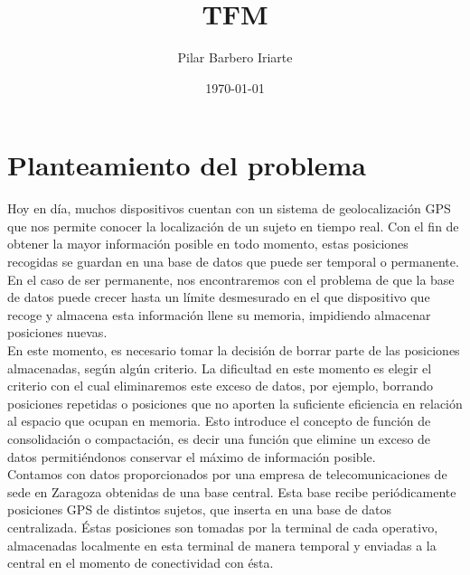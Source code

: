 \documentclass[a4paper, 12pt]{article}
\title{TFM}
\author{Pilar Barbero Iriarte}
\date{\today}
\begin{document}
\maketitle

\newpage

\tableofcontents

\newpage

\mbox{}
\thispagestyle{empty}
\newpage

\pagebreak

\newpage

\section{Planteamiento del problema}

Hoy en d\'ia, muchos dispositivos cuentan con un sistema de geolocalizaci\'on GPS que nos permite conocer la localizaci\'on de un sujeto en tiempo real. Con el fin de obtener la mayor informaci\'on posible en todo momento, estas posiciones recogidas se guardan en una base de datos que puede ser temporal o permanente. En el caso de ser permanente, nos encontraremos con el problema de que la base de datos puede crecer hasta un l\'imite desmesurado en el que dispositivo que recoge y almacena esta informaci\'on llene su memoria, impidiendo almacenar posiciones nuevas. \\

En este momento, es necesario tomar la decisi\'on de borrar parte de las posiciones almacenadas, seg\'un alg\'un criterio. La dificultad en este momento es elegir el criterio con el cual eliminaremos este exceso de datos, por ejemplo, borrando posiciones repetidas o posiciones que no aporten la suficiente eficiencia en relaci\'on al espacio que ocupan en memoria. Esto introduce el concepto de funci\'on de consolidaci\'on o compactaci\'on, es decir una funci\'on que elimine un exceso de datos permiti\'endonos conservar el m\'aximo de informaci\'on posible. \\

Contamos con datos proporcionados por una empresa de telecomunicaciones de sede en Zaragoza obtenidas de una base central. Esta base recibe peri\'odicamente posiciones GPS de distintos sujetos, que inserta en una base de datos centralizada. \'Estas posiciones son tomadas por la terminal de cada operativo, almacenadas localmente en esta terminal de manera temporal y enviadas a la central en el momento de conectividad con \'esta. \\
\end{document}
